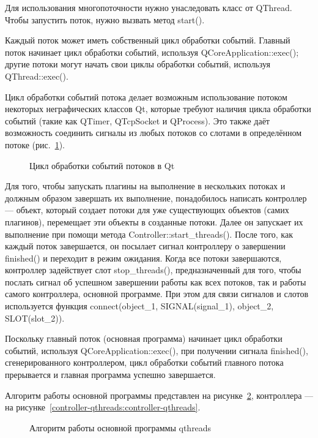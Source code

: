 Для использования многопоточности нужно унаследовать класс от QThread. Чтобы запустить поток, нужно вызвать метод start().

Каждый поток может иметь собственный цикл обработки событий. Главный поток начинает цикл обработки событий, используя QCoreApplication::exec(); другие потоки могут начать свои циклы обработки событий, используя QThread::exec().

Цикл обработки событий потока делает возможным использование потоком некоторых неграфических классов Qt, которые требуют наличия цикла обработки событий (такие как QTimer, QTcpSocket и QProcess). Это также даёт возможность соединить сигналы из любых потоков со слотами в определённом потоке (рис.~\ref{thread-cycle:thread-cycle}). \cite{threads}

\begin{figure}[h!]
\caption{ Цикл обработки событий потоков в Qt }
\label{thread-cycle:thread-cycle}
\end{figure}

Для того, чтобы запускать плагины на выполнение в нескольких потоках и должным образом завершать их выполнение, понадобилось написать контроллер --- объект, который создает потоки для уже существующих объектов (самих плагинов), перемещает эти объекты в созданные потоки. Далее он запускает их выполнение при помощи метода Controller::start\_threads(). После того, как каждый поток завершается, он посылает сигнал контроллеру о завершении finished() и переходит в режим ожидания. Когда все потоки завершаются, контроллер задействует слот stop\_threads(), предназначенный для того, чтобы послать сигнал об успешном завершении работы как всех потоков, так и работы самого контроллера, основной программе. При этом для связи сигналов и слотов используется функция connect(object\_1, SIGNAL(signal\_1), object\_2, SLOT(slot\_2)).  

Поскольку главный поток (основная программа) начинает цикл обработки событий, используя QCoreApplication::exec(), при получении сигнала finished(), сгенерированного контроллером, цикл обработки событий главного потока прерывается и главная программа успешно завершается. 

Алгоритм работы основной программы представлен на рисунке~\ref{main-qthreads:main-qthreads}, контроллера --- на рисунке~\ref{controller-qthreads:controller-qthreads}. 

\begin{figure}[h!]
\caption{ Алгоритм работы основной программы qthreads }
\label{main-qthreads:main-qthreads}
\end{figure}

